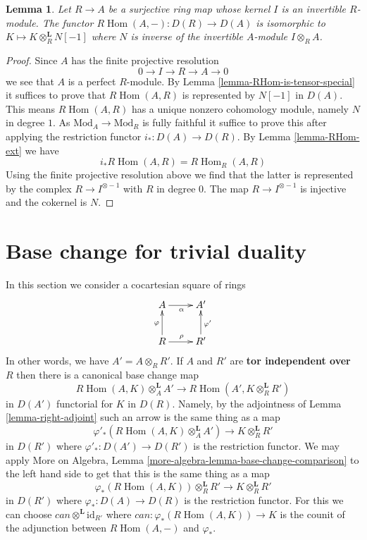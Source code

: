 \documentclass{stacks-project}
\theoremstyle{plain}
\newtheorem{lemma}[subsection]{Lemma}
\theoremstyle{definition}
\theoremstyle{remark}
\numberwithin{equation}{subsection}
\def\Hom{\mathop{\mathrm{Hom}}\nolimits}
\begin{document}
\begin{lemma}
\label{lemma-compute-for-effective-Cartier-algebraic}
Let $R \to A$ be a surjective ring map whose kernel $I$
is an invertible $R$-module. The functor
$R\Hom(A, -) : D(R) \to D(A)$
is isomorphic to $K \mapsto K \otimes_R^\mathbf{L} N[-1]$
where $N$ is inverse of the invertible $A$-module $I \otimes_R A$.
\end{lemma}

\begin{proof}
Since $A$ has the finite projective resolution
$$
0 \to I \to R \to A \to 0
$$
we see that $A$ is a perfect $R$-module. By
Lemma \ref{lemma-RHom-is-tensor-special} it suffices
to prove that $R\Hom(A, R)$ is represented by $N[-1]$ in $D(A)$.
This means $R\Hom(A, R)$ has a unique nonzero
cohomology module, namely $N$ in degree $1$. As
$\text{Mod}_A \to \text{Mod}_R$ is fully faithful it suffice to prove
this after applying the restriction functor $i_* : D(A) \to D(R)$.
By Lemma \ref{lemma-RHom-ext} we have
$$
i_*R\Hom(A, R) = R\Hom_R(A, R)
$$
Using the finite projective resolution above we find that the latter
is represented by the complex $R \to I^{\otimes -1}$ with $R$
in degree $0$. The map $R \to I^{\otimes -1}$ is injective
and the cokernel is $N$.
\end{proof}





\section{Base change for trivial duality}
\label{section-base-change-trivial-duality}

\noindent
In this section we consider a cocartesian square of rings
$$
\xymatrix{
A \ar[r]_\alpha & A' \\
R \ar[u]^\varphi \ar[r]^\rho & R' \ar[u]_{\varphi'}
}
$$
In other words, we have $A' = A \otimes_R R'$. If $A$ and $R'$
are {\bf tor independent over} $R$ then there is a canonical base change map
\begin{equation}
\label{equation-base-change}
R\Hom(A, K) \otimes_A^\mathbf{L} A'
\longrightarrow
R\Hom(A', K \otimes_R^\mathbf{L} R')
\end{equation}
in $D(A')$ functorial for $K$ in $D(R)$. Namely, by the adjointness
of Lemma \ref{lemma-right-adjoint} such an arrow is the same thing as a map
$$
\varphi'_*\left(R\Hom(A, K) \otimes_A^\mathbf{L} A'\right)
\longrightarrow
K \otimes_R^\mathbf{L} R'
$$
in $D(R')$ where $\varphi'_* : D(A') \to D(R')$ is the restriction functor.
We may apply
More on Algebra, Lemma \ref{more-algebra-lemma-base-change-comparison}
to the left hand side to get that this is the same thing as a map
$$
\varphi_*(R\Hom(A, K)) \otimes_R^\mathbf{L} R'
\longrightarrow
K \otimes_R^\mathbf{L} R'
$$
in $D(R')$ where $\varphi_* : D(A) \to D(R)$ is the restriction functor.
For this we can choose $can \otimes^\mathbf{L} \text{id}_{R'}$
where $can : \varphi_*(R\Hom(A, K)) \to K$ is the
counit of the adjunction between $R\Hom(A, -)$ and $\varphi_*$.
\end{document}
